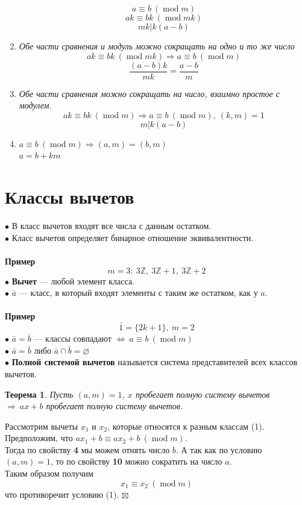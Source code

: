 \documentclass[a4paper, 12pt]{article}
\newtheorem*{theorem}{Теорема}
\newenvironment{Proof}
{\par\noindent{$\blacklozenge$}}
{\hfill$\scriptstyle\boxtimes$}
\renewcommand{\mod}{\operatorname{mod}}
\newcommand{\Z}{\mathbb{Z}}
\begin{document}
\begin{enumerate}
        $$a \equiv b \ (\mod m)$$
        $$ak \equiv bk \ (\mod mk)$$
        $$mk|k(a-b)$$
        \item \textit{Обе части сравнения и модуль можно сокращать на одно и то же число}
        $$ak \equiv bk \ (\mod mk) \Rightarrow a \equiv b \ (\mod m)$$
        $$\dfrac{(a-b)k}{mk}=\dfrac{a-b}{m}$$
        \item \textit{Обе части сравнения можно сокращать на число, взаимно простое с модулем.}
        $$ak \equiv bk \ (\mod m) \Rightarrow a \equiv b \ (\mod m), \ (k,m)=1$$
        $$m|k(a-b)$$
        \item $a \equiv b \ (\mod m) \Rightarrow (a,m)=(b,m)$\\
        $a=b+km$
    \end{enumerate}
    \section{Классы вычетов}
    $\bullet$ В класс вычетов входят все числа с данным остатком.\\
    $\bullet$ Класс вычетов определяет бинарное отношение эквивалентности.\\\\
    \textbf{Пример}\\
    $$m = 3: \ 3\Z, \ 3\Z+1, \ 3\Z+2$$
    $\bullet$ \textbf{Вычет} --- любой элемент класса.\\
    $\bullet$ $\bar{a}$ --- класс, в который входят элементы с таким же остатком, как у $a$.\\\\
    \textbf{Пример}
    $$\bar{1}=\{2k+1\}, \ m=2$$
    $\bullet$ $\bar{a} = \bar{b}$ --- классы совпадают $\Leftrightarrow \ a \equiv b \ (\mod m)$\\
    $\bullet$ $\bar{a} = \bar{b}$ либо $\bar{a} \cap \bar{b} = \varnothing$\\
    $\bullet$ \textbf{Полной системой вычетов} называется система представителей всех классов вычетов.
    \begin{theorem}
        Пусть $(a,m)=1$, $x$ пробегает полную систему вычетов $\Rightarrow \ ax+b$ пробегает полную систему вычетов.
    \end{theorem}
    \begin{Proof}
    Рассмотрим вычеты $x_1$ и $x_2$, которые относятся к разным классам (1).\\
    Предположим, что $ax_1+b \equiv ax_2+b \ (\mod m)$.\\
    Тогда по свойству \textbf{4} мы можем отнять число $b$. А так как по условию $(a,m)=1$, то по свойству \textbf{10} можно сократить на число $a$.\\
    Таким образом получим $$x_1 \equiv x_2 \ (\mod m)$$
    что противоречит условию (1).
    \end{Proof}\\
\end{document}
